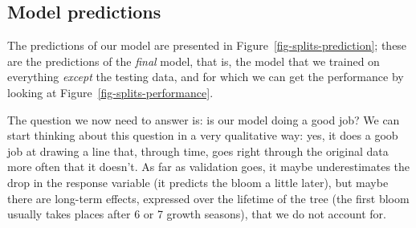 \documentclass[
  letterpaper,
]{scrbook}
\begin{document}
\subsection{Model predictions}\label{model-predictions}

The predictions of our model are presented in
Figure~\ref{fig-splits-prediction}; these are the predictions of the
\emph{final} model, that is, the model that we trained on everything
\emph{except} the testing data, and for which we can get the performance
by looking at Figure~\ref{fig-splits-performance}.

\begin{figure}[bt]



\end{figure}%

The question we now need to answer is: is our model doing a good job? We
can start thinking about this question in a very qualitative way: yes,
it does a goob job at drawing a line that, through time, goes right
through the original data more often that it doesn't. As far as
validation goes, it maybe underestimates the drop in the response
variable (it predicts the bloom a little later), but maybe there are
long-term effects, expressed over the lifetime of the tree (the first
bloom usually takes places after 6 or 7 growth seasons), that we do not
account for.

\end{document}
